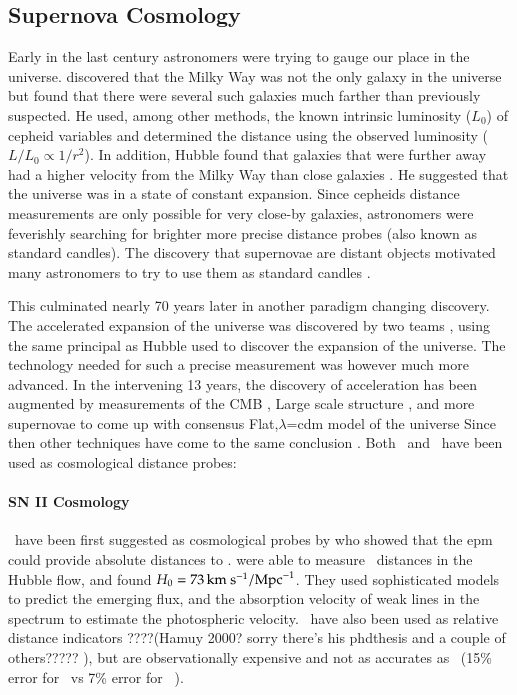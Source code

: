 \subsection{Supernova Cosmology}
Early in the last century astronomers were trying to gauge our place in the universe. \citet{1926ApJ....64..321H} discovered that the Milky Way was not the only galaxy in the universe but found that there were several such galaxies much farther than previously suspected. He used, among other methods, the known intrinsic luminosity ($L_0$) of \gls{cepheid} variables and determined the distance using the observed luminosity ($L/L_0 \propto 1/r^2$).  In addition, Hubble found that galaxies that were further away had a higher velocity from the Milky Way than close galaxies \citep{1929PNAS...15..168H}. He suggested that the universe was in a state of constant expansion. Since \glspl{cepheid} distance measurements are only possible for very close-by galaxies, astronomers were feverishly searching for brighter more precise distance probes (also known as standard candles). The discovery that supernovae are distant objects \citet{1934PNAS...20..254B} motivated many astronomers to try to use them as standard candles \citep{1938ApJ....88..285B, 1960ZA.....49..201V, 1968AJ.....73.1021K,1990A&A...230...81L, 1990AJ....100..530M}. 

This culminated nearly 70 years later in another paradigm changing discovery. The accelerated expansion of the universe was discovered by two teams \citep{1998AJ....116.1009R, 1999ApJ...517..565P}, using the same principal as Hubble used to discover the expansion of the universe. The technology needed for such a precise measurement was however much more advanced. In the intervening 13 years, the discovery of acceleration has been augmented by measurements of the CMB \cite[e.g. WMAP7;][]{2011ApJS..192...18K}, Large scale structure \citep[e.g.][]{2011MNRAS.tmp..951B}, and more supernovae \citep[e.g.]{2011A&A...525A...7A} to come up with consensus Flat,$\lambda$=\gls{cdm} model of the universe \citep[e.g.][]{2011arXiv1104.1444S}
Since then other techniques have come to the same conclusion . Both \sneia\ and \snii\ have been used as cosmological distance probes:

\paragraph{SN II Cosmology}
\sniip\ have been first suggested as cosmological probes by \citet{1974ApJ...193...27K} who showed that the \gls{epm} could provide absolute distances to \sneii. \cite{1994ApJ...432...42S} were able to measure \snii\ distances in the Hubble flow, and found $H_0 = 73\,\textrm{km}~\textrm{s}^{-1} / \textrm{Mpc}^{-1}$. They used sophisticated models to predict the emerging flux, and the absorption velocity of weak lines in the spectrum to estimate the photospheric velocity.  \sniip\ have also been used as relative distance indicators ????(Hamuy 2000? sorry there's his phdthesis and a couple of others????? ), but are observationally expensive and not as accurates as \snia\ (15\% error for \snii\  vs 7\% error for \snia\ \citep{2006ApJ...645..841N}).

